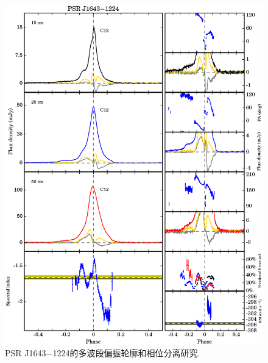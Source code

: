 \begin{figure}
\begin{center}
\includegraphics[width=6 in]{1643.ps}
\caption{PSR J1643$-$1224的多波段偏振轮廓和相位分离研究.}
\label{1643}
\end{center}
\end{figure}

